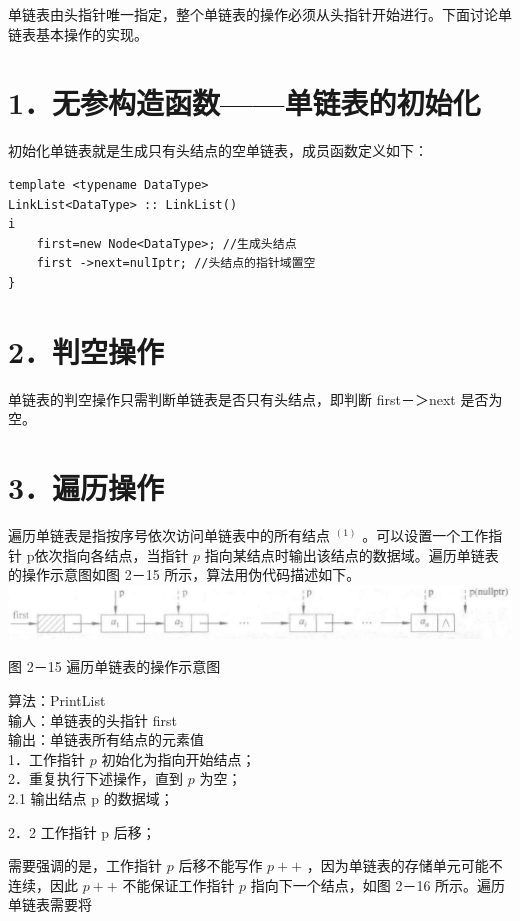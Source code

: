 \documentclass[10pt]{article}
\begin{document}
单链表由头指针唯一指定，整个单链表的操作必须从头指针开始进行。下面讨论单链表基本操作的实现。

\section*{1．无参构造函数——单链表的初始化}
初始化单链表就是生成只有头结点的空单链表，成员函数定义如下：

\begin{verbatim}
template <typename DataType>
LinkList<DataType> :: LinkList()
i
    first=new Node<DataType>; //生成头结点
    first ->next=nulIptr; //头结点的指针域置空
}
\end{verbatim}

\section*{2．判空操作}
单链表的判空操作只需判断单链表是否只有头结点，即判断 first－＞next 是否为空。

\section*{3．遍历操作}
遍历单链表是指按序号依次访问单链表中的所有结点 ${ }^{(1)}$ 。可以设置一个工作指针 p依次指向各结点，当指针 $p$ 指向某结点时输出该结点的数据域。遍历单链表的操作示意图如图 2－15 所示，算法用伪代码描述如下。\\
\includegraphics[max width=\textwidth, center]{2025_06_06_704745ea57b15b2333e5g-054}

图 2－15 遍历单链表的操作示意图

算法：PrintList\\
输人：单链表的头指针 first\\
输出：单链表所有结点的元素值\\
1．工作指针 $p$ 初始化为指向开始结点；\\
2．重复执行下述操作，直到 $p$ 为空；\\
2.1 输出结点 p 的数据域；

2．2 工作指针 p 后移；

需要强调的是，工作指针 $p$ 后移不能写作 $p++$ ，因为单链表的存储单元可能不连续，因此 $p++$ 不能保证工作指针 $p$ 指向下一个结点，如图 2－16 所示。遍历单链表需要将
\end{document}
